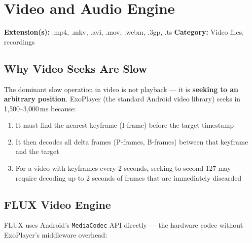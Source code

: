 \documentclass[11pt, a4paper, openright]{report}
\newcommand{\filesection}[3]{%
  \begin{insightbox}[title={File Type Overview: #1}]
  \textbf{Extension(s):} #2 \quad \textbf{Category:} #3
  \end{insightbox}
}
\begin{document}
\chapter{Video and Audio Engine}

\filesection{Video}{.mp4, .mkv, .avi, .mov, .webm, .3gp, .ts}{Video files, recordings}

\section{Why Video Seeks Are Slow}

The dominant slow operation in video is not playback --- it is \textbf{seeking to an arbitrary position}. ExoPlayer (the standard Android video library) seeks in 1,500--3,000\,ms because:

\begin{enumerate}
  \item It must find the nearest keyframe (I-frame) before the target timestamp
  \item It then decodes all delta frames (P-frames, B-frames) between that keyframe and the target
  \item For a video with keyframes every 2 seconds, seeking to second 127 may require decoding up to 2 seconds of frames that are immediately discarded
\end{enumerate}

\section{FLUX Video Engine}

FLUX uses Android's \texttt{MediaCodec} API directly --- the hardware codec without ExoPlayer's middleware overhead:
\end{document}
